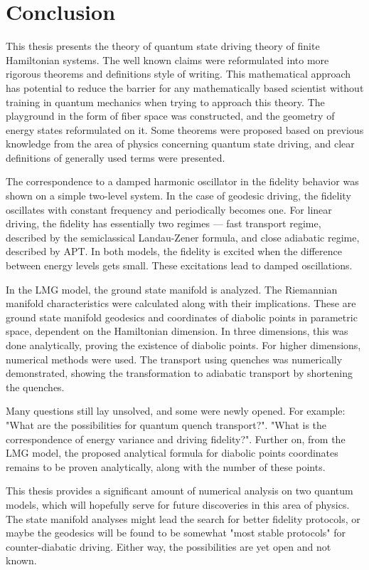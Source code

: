 \chapter*{Conclusion}
This thesis presents the theory of quantum state driving theory of finite Hamiltonian systems. The well known claims were reformulated into more rigorous theorems and definitions style of writing. This mathematical approach has potential to reduce the barrier for any mathematically based scientist without training in quantum mechanics when trying to approach this theory. The playground in the form of fiber space was constructed, and the geometry of energy states reformulated on it. Some theorems were proposed based on previous knowledge from the area of physics concerning quantum state driving, and clear definitions of generally used terms were presented.

The correspondence to a damped harmonic oscillator in the fidelity behavior was shown on a simple two-level system. In the case of geodesic driving, the fidelity oscillates with constant frequency and periodically becomes one. For linear driving, the fidelity has essentially two regimes — fast transport regime, described by the semiclassical Landau-Zener formula, and close adiabatic regime, described by APT. In both models, the fidelity is excited when the difference between energy levels gets small. These excitations lead to damped oscillations.

In the LMG model, the ground state manifold is analyzed. The Riemannian manifold characteristics were calculated along with their implications. These are ground state manifold geodesics and coordinates of diabolic points in parametric space, dependent on the Hamiltonian dimension. In three dimensions, this was done analytically, proving the existence of diabolic points. For higher dimensions, numerical methods were used. The transport using quenches was numerically demonstrated, showing the transformation to adiabatic transport by shortening the quenches.

Many questions still lay unsolved, and some were newly opened. For example: "What are the possibilities for quantum quench transport?". "What is the correspondence of energy variance and driving fidelity?". Further on, from the LMG model, the proposed analytical formula for diabolic points coordinates remains to be proven analytically, along with the number of these points.

This thesis provides a significant amount of numerical analysis on two quantum models, which will hopefully serve for future discoveries in this area of physics. The state manifold analyses might lead the search for better fidelity protocols, or maybe the geodesics will be found to be somewhat "most stable protocols" for counter-diabatic driving. Either way, the possibilities are yet open and not known.